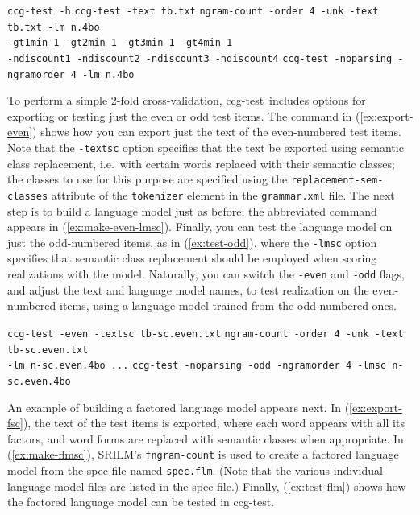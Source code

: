 \documentclass[11pt]{article}
\newcommand{\ccgtest}{\textsf{ccg-test}}
\newcommand{\code}[1]{\texttt{#1}} %
\newcommand{\eref}[2][]{(\ref{ex:#2}#1)} %
\begin{document}
\begin{exe}
  \ex %
  \begin{xlist}
  \ex \label{ex:ccg-test-help}
  \code{ccg-test -h}
  \ex \label{ex:export-text} 
  \code{ccg-test -text tb.txt}
  \ex \label{ex:make-lm} 
  \code{ngram-count -order 4 -unk -text tb.txt -lm n.4bo \\
  -gt1min 1 -gt2min 1 -gt3min 1 -gt4min 1 \\
  -ndiscount1 -ndiscount2 -ndiscount3 -ndiscount4}
  \ex \label{ex:test-lm}
  \code{ccg-test -noparsing -ngramorder 4 -lm n.4bo}
  \end{xlist}
\end{exe}

To perform a simple 2-fold cross-validation, \ccgtest\ includes options
for exporting or testing just the even or odd test items. The command in
\eref{export-even} shows how you can export just the text of the
even-numbered test items. Note that the \code{-textsc} option specifies
that the text be exported using semantic class replacement, i.e.\ with
certain words replaced with their semantic classes; the classes to use
for this purpose are specified using the \code{replacement-sem-classes}
attribute of the \code{tokenizer} element in the \code{grammar.xml}
file.  The next step is to build a language model just as before; the
abbreviated command appears in \eref{make-even-lmsc}.  Finally, you can
test the language model on just the odd-numbered items, as in
\eref{test-odd}, where the \code{-lmsc} option specifies that semantic
class replacement should be employed when scoring realizations with the
model.  Naturally, you can switch the \code{-even} and \code{-odd}
flags, and adjust the text and language model names, to test realization
on the even-numbered items, using a language model trained from the
odd-numbered ones.

\begin{exe}
  \ex %
  \begin{xlist}
  \ex \label{ex:export-even} 
  \code{ccg-test -even -textsc tb-sc.even.txt}
  \ex \label{ex:make-even-lmsc} 
  \code{ngram-count -order 4 -unk -text tb-sc.even.txt \\
  -lm n-sc.even.4bo ...}
  \ex \label{ex:test-odd}
  \code{ccg-test -noparsing -odd -ngramorder 4 -lmsc n-sc.even.4bo}
  \end{xlist}
\end{exe}

An example of building a factored language model appears next. In
\eref{export-fsc}, the text of the test items is exported, where each
word appears with all its factors, and word forms are replaced with
semantic classes when appropriate.  In \eref{make-flmsc}, SRILM's
\code{fngram-count} is used to create a factored language model from the
spec file named \code{spec.flm}.  (Note that the various individual
language model files are listed in the spec file.)  Finally,
\eref{test-flm} shows how the factored language model can be tested in
\ccgtest.
\end{document}
